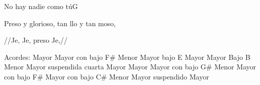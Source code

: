 \documentclass[12pt, spanish]{book}
\begin{document}
\begin{song}{No hay nadie como tú}{G}
\begin{SBChorus}
            Preso y glorioso,    tan llo y tan moso,

            //Je,    Je, preso Je,//~~
        \end{SBChorus}

        \ifChordBk
        \begin{SBOpGroup}
            Acordes:\break
             Mayor \hfill
             Mayor con bajo F\# \hfill\null\break
             Menor \hfill
             Mayor bajo E \hfill\null\break
             Mayor \hfill
             Mayor Bajo B \hfill\null\break
             Menor \hfill
             Mayor suspendida cuarta \hfill\null\break
             Mayor \hfill
             Mayor \hfill\null\break
             Mayor con bajo G\# \hfill
             Menor \hfill\null\break
             Mayor con bajo F\# \hfill
             Mayor con bajo C\# \hfill\null\break
             Menor \hfill
             Mayor suspendido \hfill\null\break
             Mayor \hfill\null\break
        \end{SBOpGroup}

        \fi
    \end{song}
\end{document}
